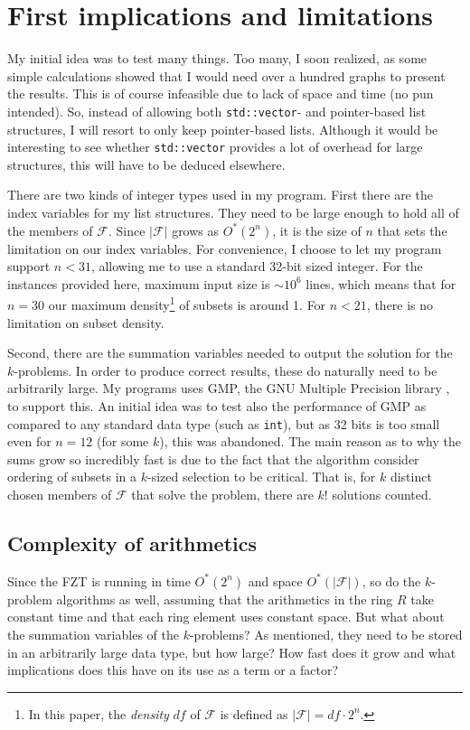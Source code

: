 \documentclass[a4paper, titlepage]{article}
\newcommand{\code}{\texttt}
\begin{document}
\section{First implications and limitations}
My initial idea was to test many things. Too many, I soon realized, as some simple calculations showed that I would need over a hundred graphs to present the results. This is of course infeasible due to lack of space and time (no pun intended). So, instead of allowing both \code{std::vector}- and pointer-based list structures, I will resort to only keep pointer-based lists. Although it would be interesting to see whether \code{std::vector} provides a lot of overhead for large structures, this will have to be deduced elsewhere.

There are two kinds of integer types used in my program. First there are the index variables for my list structures. They need to be large enough to hold all of the members of $\mathcal{F}$. Since $|\mathcal{F}|$ grows as $O^*(2^n)$, it is the size of $n$ that sets the limitation on our index variables. For convenience, I choose to let my program support $n < 31$, allowing me to use a standard 32-bit sized integer. For the instances provided here, maximum input size is $\sim 10^6$ lines, which means that for $n=30$ our maximum density\footnote{In this paper, the \emph{density} $df$ of $\mathcal{F}$ is defined as $|\mathcal{F}| = df\cdot2^n$.} of subsets is around 1\permil. For $n<21$, there is no limitation on subset density.

Second, there are the summation variables needed to output the solution for the $k$-problems. In order to produce correct results, these do naturally need to be arbitrarily large. My programs uses GMP, the GNU Multiple Precision library \cite{gmp}, to support this. An initial idea was to test also the performance of GMP as compared to any standard data type (such as \code{int}), but as 32 bits is too small even for $n=12$ (for some $k$), this was abandoned. The main reason as to why the sums grow so incredibly fast is due to the fact that the algorithm consider ordering of subsets in a $k$-sized selection to be critical. That is, for $k$ distinct chosen members of $\mathcal{F}$ that solve the problem, there are $k!$ solutions counted.

\subsection{Complexity of arithmetics}
Since the FZT is running in time $O^*(2^n)$ and space $O^*(|\mathcal{F}|)$, so do the $k$-problem algorithms as well, assuming that the arithmetics in the ring $R$ take constant time and that each ring element uses constant space. But what about the summation variables of the $k$-problems? As mentioned, they need to be stored in an arbitrarily large data type, but how large? How fast does it grow and what implications does this have on its use as a term or a factor?
\end{document}
